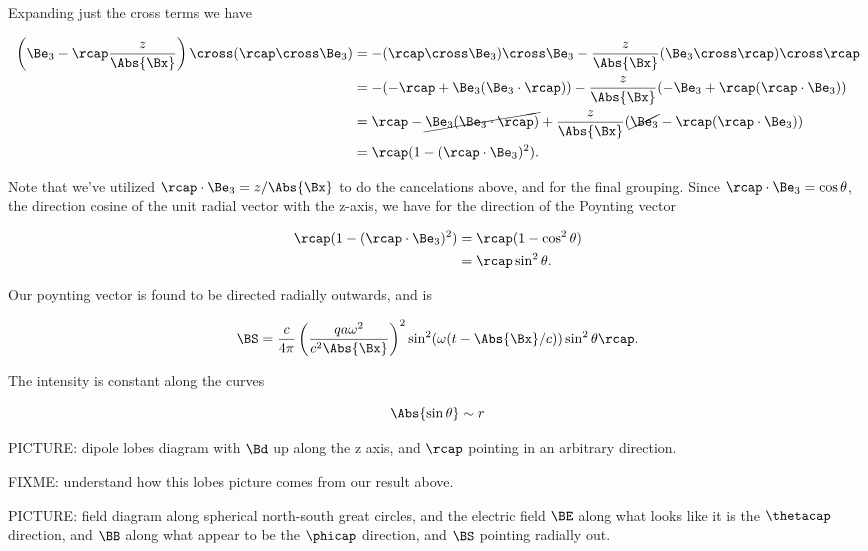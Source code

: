 Expanding just the cross terms we have

\begin{align*}
\left( \Be_3 - \rcap \frac{z}{\Abs{\Bx}} \right) \cross (\rcap \cross \Be_3)
&=
-(\rcap \cross \Be_3) \cross \Be_3 - \frac{z}{\Abs{\Bx}} (\Be_3 \cross \rcap) \cross \rcap \\
&=
-(-\rcap + \Be_3(\Be_3 \cdot \rcap) ) - \frac{z}{\Abs{\Bx}} (-\Be_3 + \rcap (\rcap \cdot \Be_3)) \\
&=
\rcap - \cancel{\Be_3(\Be_3 \cdot \rcap)} + \frac{z}{\Abs{\Bx}} (\cancel{\Be_3} - \rcap (\rcap \cdot \Be_3)) \\
&=
\rcap( 1 - (\rcap \cdot \Be_3)^2 ).
\end{align*}

Note that we've utilized $\rcap \cdot \Be_3 = z/\Abs{\Bx}$ to do the cancelations above, and for the final grouping.  Since $\rcap \cdot \Be_3 = \cos\theta$, the direction cosine of the unit radial vector with the z-axis, we have for the direction of the Poynting vector

\begin{align*}
\rcap( 1 - (\rcap \cdot \Be_3)^2 ) 
&= \rcap (1 - \cos^2\theta) \\
&= \rcap \sin^2\theta.
\end{align*}

Our poynting vector is found to be directed radially outwards, and is

\begin{equation}\label{eqn:relativisticElectrodynamicsL21:n}
\BS =
\frac{c}{4 \pi}
\left( \frac{q a \omega^2}{c^2 \Abs{\Bx} } \right)^2
\sin^2(\omega (t - \Abs{\Bx}/c)) \sin^2\theta \rcap.
\end{equation}

The intensity is constant along the curves

\begin{equation}\label{eqn:relativisticElectrodynamicsL21:n}
\Abs{\sin\theta} \sim r
\end{equation}

PICTURE: dipole lobes diagram with $\Bd$ up along the z axis, and $\rcap$ pointing in an arbitrary direction.  

FIXME: understand how this lobes picture comes from our result above.

PICTURE: field diagram along spherical north-south great circles, and the electric field $\BE$ along what looks like it is the $\thetacap$ direction, and $\BB$ along what appear to be the $\phicap$ direction, and $\BS$ pointing radially out.

